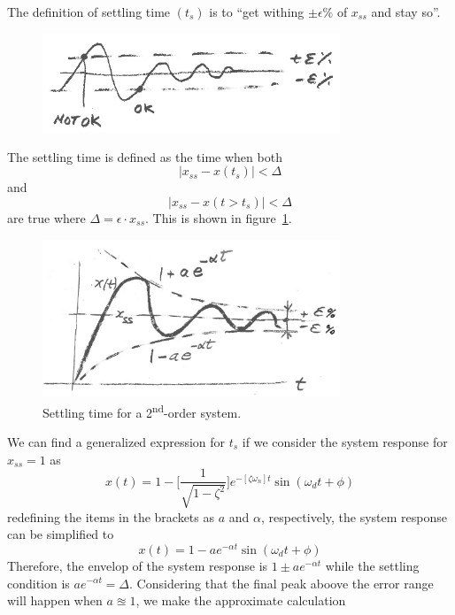 \documentclass[12pt,letter]{article}
\numberwithin{ex}{section} %
\numberwithin{re}{section} %
\numberwithin{equation}{section}	%
\begin{document}
The definition of settling time $(t_s)$ is to ``get withing $\pm \epsilon \%$ of $x_{ss}$ and stay so''. 
\begin{figure}[H]
	\centering
	\includegraphics[width=3.5in]{../figures/2nd_order_settling_time_definition.png}
\end{figure}
\noindent The settling time is defined as the time when both 
\begin{equation}
|x_{ss} - x(t_s)| < \Delta
\end{equation}
and
\begin{equation}
|x_{ss} - x(t > t_s)| < \Delta
\end{equation}
are true where $\Delta = \epsilon \cdot x_{ss}$. This is shown in figure~\ref{fig:2nd_order_settling_time}.
\begin{figure}[H]
	\centering
	\includegraphics[width=3.5in]{../figures/2nd_order_settling_time.png}
	\caption{Settling time for a 2\textsuperscript{nd}-order system.}
	\label{fig:2nd_order_settling_time}
\end{figure}
\noindent We can find a generalized expression for $t_s$ if we consider the system response for $x_{ss} = 1$ as
\begin{equation}
x(t) = 1 - \bigg[\frac{1}{\sqrt{1-\zeta^2}} \bigg] e^{-[\zeta \omega_n] t} \sin(\omega_d t+ \phi)
\end{equation}
redefining the items in the brackets as $a$ and $\alpha$, respectively, the system response can be simplified to
\begin{equation}
x(t) = 1 - a e^{-\alpha t} \sin(\omega_d t+ \phi)
\end{equation}
Therefore, the envelop of the system response is $1\pm a e^{- \alpha t}$ while the settling condition is $a e^{- \alpha t} = \Delta$. Considering that the final peak aboove the error range will happen when $a \approxeq 1$, we make the approximate calculation
\end{document}
